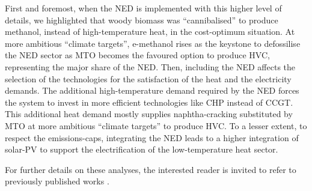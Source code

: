 First and foremost, when the \gls{NED} is implemented with this higher level of details, we highlighted that woody biomass was ``cannibalised'' to produce methanol, instead of high-temperature heat, in the cost-optimum situation. At more ambitious ``climate targets'', e-methanol rises as the keystone to defossilise the \gls{NED} sector as \gls{MTO} becomes the favoured option to produce \gls{HVC}, representing the major share of the \gls{NED}. Then, including the \gls{NED} affects the selection of the technologies for the satisfaction of the heat and the electricity demands. The additional high-temperature demand required by the \gls{NED} forces the system to invest in more efficient technologies like \gls{CHP} instead of \gls{CCGT}. This additional heat demand mostly supplies naphtha-cracking substituted by \gls{MTO} at more ambitious ``climate targets'' to produce \gls{HVC}. To a lesser extent, to respect the emissions-caps, integrating the \gls{NED} leads to a higher integration of solar-\gls{PV} to support the electrification of the low-temperature heat sector.


For further details on these analyses, the interested reader is invited to refer to previously published works \cite{rixhon2021comprehensive,rixhon2022integration}.

